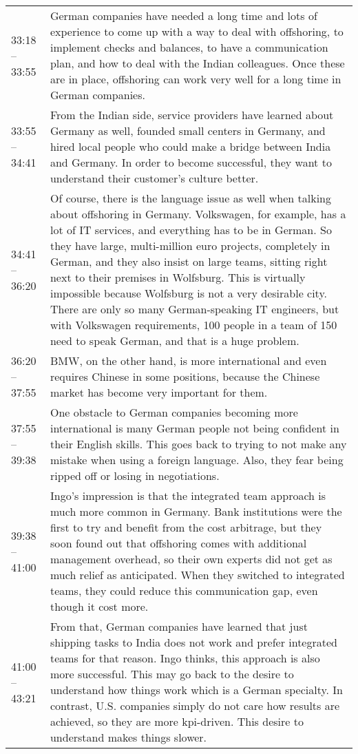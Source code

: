 \begin{appendix}
\begin{longtable}{l p{12.5cm}}
	33:18 -- 33:55 & German companies have needed a long time and lots of experience to come up with a way to deal with offshoring, to implement checks and balances, to have a communication plan, and how to deal with the Indian colleagues. Once these are in place, offshoring can work very well for a long time in German companies.\\
	33:55 -- 34:41&From the Indian side, service providers have learned about Germany as well, founded small centers in Germany, and hired local people who could make a bridge between India and Germany. In order to become successful, they want to understand their customer's culture better.\\
	34:41 -- 36:20&Of course, there is the language issue as well when talking about offshoring in Germany. Volkswagen, for example, has a lot of IT services, and everything has to be in German. So they have large, multi-million euro projects, completely in German, and they also insist on large teams, sitting right next to their premises in Wolfsburg. This is virtually impossible because Wolfsburg is not a very desirable city. There are only so many German-speaking IT engineers, but with Volkswagen requirements, 100 people in a team of 150 need to speak German, and that is a huge problem.\\
	36:20 -- 37:55 & BMW, on the other hand, is more international and even requires Chinese in some positions, because the Chinese market has become very important for them.\\
	37:55 -- 39:38& One obstacle to German companies becoming more international is many German people not being confident in their English skills. This goes back to trying to not make any mistake when using a foreign language. Also, they fear being ripped off or losing in negotiations.\\
	39:38 -- 41:00&Ingo's impression is that the integrated team approach is much more common in Germany. Bank institutions were the first to try and benefit from the cost arbitrage, but they soon found out that offshoring comes with additional management overhead, so their own experts did not get as much relief as anticipated. When they switched to integrated teams, they could reduce this communication gap, even though it cost more.\\
	41:00 -- 43:21&From that, German companies have learned that just shipping tasks to India does not work and prefer integrated teams for that reason. Ingo thinks, this approach is also more successful. This may go back to the desire to understand how things work which is a German specialty. In contrast, U.S. companies simply do not care how results are achieved, so they are more \gls{kpi}-driven. This desire to understand makes things slower.\\

\end{longtable}
\end{appendix}
